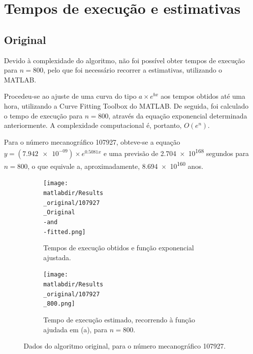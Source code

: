 \documentclass[portuguese,11pt,a4paper,titlepage]{article}
\newcommand{\matlabdir}{"../MATLAB-fittings"}
\begin{document}
\section{Tempos de execução e estimativas}
\subsection{Original} \label{original_study}
Devido à complexidade do algoritmo, não foi possível obter tempos de execução para \begin{math}n = 800\end{math},
pelo que foi necessário recorrer a estimativas, utilizando o MATLAB.

Procedeu-se ao ajuste de uma curva do tipo \begin{math}a\times e^{bx}\end{math}
aos tempos obtidos até uma hora, utilizando a Curve Fitting Toolbox do MATLAB.
De seguida, foi calculado o tempo de execução para \begin{math}n = 800\end{math},
através da equação exponencial determinada anteriormente.
A complexidade computacional é, portanto, \begin{math}O(e^n)\end{math}.

Para o número mecanográfico 107927, obteve-se a equação \begin{math}y = (\num{7.942e-09})\times e^{0.5081x}\end{math}
e uma previsão de \num{2.704e+168} segundos para \begin{math}n = 800\end{math}, o que equivale a, aproximadamente, \num{8.694e+160} anos.

\begin{figure}[h]
	\begin{subfigure}{0.47\textwidth}
	\texttt{[image: \\matlabdir/Results\\\_original/107927\\\_Original\\-and\\-fitted.png]} 
	\caption{Tempos de execução obtidos e função exponencial ajustada.}
	\label{fig:original_107927_plot}
	\end{subfigure}
	\hspace{0.049\textwidth}
	\begin{subfigure}{0.47\textwidth}
	\texttt{[image: \\matlabdir/Results\\\_original/107927\\\_800.png]}
	\caption{Tempo de execução estimado, recorrendo à função ajudada em (a), para \begin{math}n=800\end{math}.}
	\label{fig:original_107927_800}
	\end{subfigure}
	
	\caption{Dados do algoritmo original, para o número mecanográfico 107927.}
	\label{fig:original_107927}
\end{figure}
\end{document}
